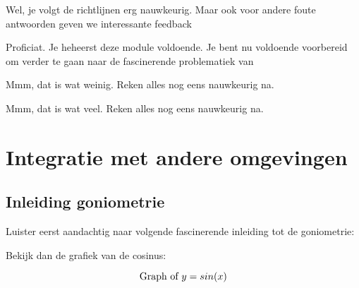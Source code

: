 \documentclass{ximera}
\begin{document}
\begin{problem}
\begin{question}
 
      
          \begin{feedback}[y==7]
            Wel, je volgt de richtlijnen erg nauwkeurig. Maar ook voor andere foute antwoorden geven we interessante feedback
          \end{feedback}
          \begin{feedback}[y==8]
          Proficiat. Je heheerst deze module voldoende. Je bent nu voldoende voorbereid om verder te gaan naar de fascinerende problematiek van 
          \end{feedback}
          \begin{feedback}[y<7]
              Mmm, dat is wat weinig. Reken alles nog eens nauwkeurig na.
            \end{feedback}
          \begin{feedback}[y>8]
               Mmm, dat is wat veel. Reken alles nog eens nauwkeurig na.
           \end{feedback}
       \end{question}
\end{problem}

\section{Integratie met andere omgevingen}

\subsection{Inleiding goniometrie}

Luister eerst aandachtig naar volgende fascinerende inleiding tot de goniometrie:
\begin{center}
\end{center}

Bekijk dan de grafiek van de cosinus:

\[  
\graph[xmin=-5,xmax=20,ymin=-1,ymax=1]{y=sin(x)}  
\] 

\end{document}
